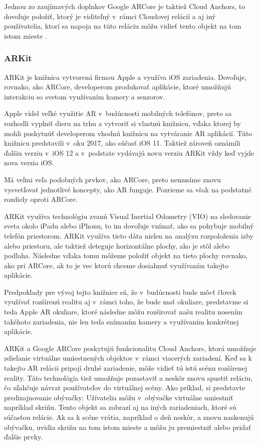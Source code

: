 Jednou zo zaujímavých doplnkov Google ARCore je taktiež Cloud Anchors, to dovoľuje položiť, ktorý je viditeľný v~rámci Cloudovej relácií a aj iný používatelia, ktorí sa napoja na túto reláciu môžu vidieť tento objekt na tom istom mieste \cite{conway2023arcore}. 

\subsubsection{ARKit}

ARKit je knižnica vytvorená firmou Apple a využíva iOS zariadenia. Dovoľuje, rovnako, ako ARCore, developerom produkovať aplikácie, ktoré umožňujú interakciu so svetom využívaním kamery a senzorov. 

Apple videl veľké využitie AR v~budúcnosti mobilných telefónov, preto sa rozhodli vyplniť dieru na trhu a vytvoriť si vlastnú knižnicu, vďaka ktorej by mohli poskytnúť developerom vhodnú knižnicu na vytváranie AR aplikácií. Túto knižnicu predstavili v~oku 2017, ako súčasť iOS 11. Taktiež zároveň oznámili ďalšiu verziu v~iOS 12 a v~podstate vydávajú novu verziu ARKit vždy keď vyjde nova verzia iOS. 

Má veľmi veľa podobných prvkov, ako ARCore, preto nemusíme znovu vysvetľovať jednotlivé koncepty, ako AR funguje. Pozrieme sa však na podstatné rozdiely oproti ARCore.

ARKit využíva technológiu zvanú Visual Inertial Odometry (VIO) na sledovanie sveta okolo iPadu alebo iPhonu, to im dovoľuje vnímať, ako sa pohybuje mobilný telefón priestorom. ARKit využíva tieto dáta nielen na analýzu rozpoloženia izby alebo priestoru, ale taktiež deteguje horizontálne plochy, ako je stôl alebo podlaha. Následne vďaka tomu môžeme položiť objekt na tieto plochy rovnako, ako pri ARCore, ak to je vec ktorú chceme dosiahnuť využívaním takejto aplikácie.

Predpoklady pre vývoj tejto knižnice sú, že v~budúcnosti bude môcť človek využívať rozšírenú realitu aj v~rámci toho, že bude mať okuliare, predstavme si teda Apple AR okuliare, ktoré následne môžu rozširovať našu realitu nosením takéhoto zariadenia, nie len teda snímaním kamery a využívaním konkrétnej aplikácie.

ARKit a Google ARCore poskytujú funkcionalitu Cloud Anchors, ktorá umožňuje zdieľanie virtuálne umiestnených objektov v~rámci viacerých zariadení. Keď sa k takejto AR relácii pripojí druhé zariadenie, môže vidieť tú istú scénu rozšírenej reality. Táto technológia tiež umožňuje pozastaviť a neskôr znovu spustiť reláciu, čo uľahčuje návrat používateľov do virtuálnej scény. Ako príklad, si predstavte predizajnovanie obývačky: Užívatelia môžu v~obývačke virtuálne umiestniť napríklad skriňu. Tento objekt sa zobrazí aj na iných zariadeniach, ktoré sú súčasťou relácie. Ak sa k scéne vrátia, napríklad o deň neskôr, a znovu naskenujú obývačku, uvidia skriňu na tom istom mieste a môžu ju premiestniť alebo pridať ďalšie prvky. %

